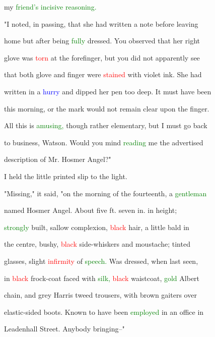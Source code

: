  my \textcolor{green}{friend's} \textcolor{green}{incisive} \textcolor{green}{reasoning.}



 "I noted, in passing, that she had written a note before \textcolor{BurntOrange}{leaving}

 home but after being \textcolor{green}{fully} dressed. You observed that her right

 glove was \textcolor{red}{torn} at the forefinger, but you did not apparently see

 that both glove and finger were \textcolor{red}{stained} with violet ink. She had

 written in a \textcolor{blue}{hurry} and dipped her pen too deep. It must have been

 this morning, or the mark would not remain clear upon the finger.

 All this is \textcolor{green}{amusing,} though rather elementary, but I must go back

 to business, Watson. Would you mind \textcolor{green}{reading} me the advertised

 description of Mr. Hosmer \textcolor{BurntOrange}{Angel?"}



 I held the little printed \textcolor{BurntOrange}{slip} to the light.



 "Missing," it said, "on the morning of the fourteenth, a \textcolor{green}{gentleman}

 named Hosmer \textcolor{BurntOrange}{Angel.} About five ft. seven in. in height;

 \textcolor{green}{strongly} built, sallow complexion, \textcolor{red}{black} hair, a little bald in

 the centre, bushy, \textcolor{red}{black} side-whiskers and moustache; tinted

 glasses, slight \textcolor{red}{infirmity} of \textcolor{green}{speech.} Was dressed, when last seen,

 in \textcolor{red}{black} frock-coat faced with \textcolor{green}{silk,} \textcolor{red}{black} waistcoat, \textcolor{green}{gold} Albert

 chain, and grey Harris tweed trousers, with brown gaiters over

 elastic-sided boots. Known to have been \textcolor{green}{employed} in an office in

 Leadenhall Street. Anybody bringing--"



